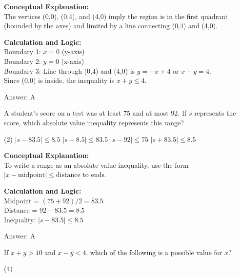 \documentclass[11pt,paper=a4,answers]{exam}
\begin{document}
\begin{questions}
\begin{solution}
\textbf{Conceptual Explanation:} \\
The vertices (0,0), (0,4), and (4,0) imply the region is in the first quadrant (bounded by the axes) and limited by a line connecting (0,4) and (4,0).

\vspace{10pt}
\textbf{Calculation and Logic:} \\
Boundary 1: $x = 0$ (y-axis) \\
Boundary 2: $y = 0$ (x-axis) \\
Boundary 3: Line through (0,4) and (4,0) is $y = -x + 4$ or $x + y = 4$. \\
Since (0,0) is inside, the inequality is $x + y \le 4$.

\vspace{15pt}
Answer: \colorbox{yellow!100}{A}
\end{solution}

\vspace{20pt}

\question
A student's score on a test was at least 75 and at most 92. If $s$ represents the score, which absolute value inequality represents this range?
\begin{tasks}(2)
    \task $|s - 83.5| \le 8.5$
    \task $|s - 8.5| \le 83.5$
    \task $|s - 92| \le 75$
    \task $|s + 83.5| \le 8.5$
\end{tasks}

\begin{solution}
\textbf{Conceptual Explanation:} \\
To write a range as an absolute value inequality, use the form $|x - \text{midpoint}| \le \text{distance to ends}$.

\vspace{10pt}
\textbf{Calculation and Logic:} \\
Midpoint = $(75 + 92) / 2 = 83.5$ \\
Distance = $92 - 83.5 = 8.5$ \\
Inequality: $|s - 83.5| \le 8.5$

\vspace{15pt}
Answer: \colorbox{yellow!100}{A}
\end{solution}

\vspace{20pt}

\question
If $x + y > 10$ and $x - y < 4$, which of the following is a possible value for $x$?
\begin{tasks}(4)
\end{tasks}


\end{questions}
\end{document}
